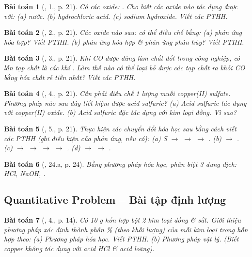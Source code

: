 \documentclass{article}
\newtheorem{baitoan}{Bài toán}
\begin{document}
\begin{baitoan}[\cite{SGK_Hoa_Hoc_9}, 1., p. 21]
	Có các oxide: \emph{}. Cho biết các oxide nào tác dụng được với: (a) nước. (b) hydrochloric acid. (c) sodium hydroxide. Viết các PTHH.
\end{baitoan}

\begin{baitoan}[\cite{SGK_Hoa_Hoc_9}, 2., p. 21]
	Các oxide nào sau: \emph{} có thể điều chế bằng: (a) phản ứng hóa hợp? Viết PTHH. (b) phản ứng hóa hợp \& phản ứng phân hủy? Viết PTHH.
\end{baitoan}

\begin{baitoan}[\cite{SGK_Hoa_Hoc_9}, 3., p. 21]
	Khí \emph{CO} được dùng làm chất đốt trong công nghiệp, có lẫn tạp chất là các khí \emph{}. Làm thế nào có thể loại bỏ được các tạp chất ra khỏi \emph{CO} bằng hóa chất rẻ tiền nhất? Viết các PTHH.
\end{baitoan}

\begin{baitoan}[\cite{SGK_Hoa_Hoc_9}, 4., p. 21]
	Cần phải điều chế 1 lượng muối copper(II) sulfate. Phương pháp nào sau đây tiết kiệm được acid sulfuric? (a) Acid sulfuric tác dụng với copper(II) oxide. (b) Acid sulfuric đặc tác dụng với kim loại đồng. Vì sao?
\end{baitoan}

\begin{baitoan}[\cite{SGK_Hoa_Hoc_9}, 5., p. 21]
	Thực hiện các chuyển đổi hóa học sau bằng cách viết các PTHH (ghi điều kiện của phản ứng, nếu có): (a) \emph{S $\to$  $\to$  $\to$ }. (b) \emph{ $\to$ }. (c) \emph{ $\to$  $\to$  $\to$  $\to$ }. (d) \emph{ $\to$  $\to$ }.
\end{baitoan}

\begin{baitoan}[\cite{An_350_BT_Hoa_Hoc_9}, 24.a, p. 24]
	Bằng phương pháp hóa học, phân biệt 3 dung dịch: \emph{HCl, NaOH, }.
\end{baitoan}

\subsection{Quantitative Problem -- Bài tập định lượng}

\begin{baitoan}[\cite{SGK_Hoa_Hoc_9}, 4., p. 14]
	Có \emph{10 g} hỗn hợp bột 2 kim loại đồng \& sắt. Giới thiệu phương pháp xác định thành phần \% (theo khối lượng) của mỗi kim loại trong hỗn hợp theo: (a) Phương pháp hóa học. Viết PTHH. (b) Phương pháp vật lý. (Biết copper không tác dụng với acid \emph{HCl} \& acid \emph{} loãng).
\end{baitoan}
\end{document}
